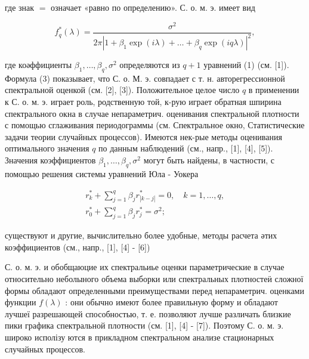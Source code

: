 \documentclass[10pt]{article}
\begin{document}
где знак $=$ означает «равно по определению». С. о. м. э. имеет вид



\[

f_{q}^{*}(\lambda)=\frac{\sigma^{2}}{2 \pi\left|1+\beta_{1} \exp (i \lambda)+\ldots+\beta_{q} \exp (i q \lambda)\right|^{2}},

\]



где коәффициенты $\beta_{1}, \ldots, \beta_{q}, \sigma^{2}$ определяются из $q+1$ уравнений (1) (см. [1]). Формула (3) показывает, что С. о. М. э. совпадает с т. н. авторегрессионной спектральной оценкой (см. [2], [3]). Положительное целое число $q$ в применении к С. о. м. э. играет роль, родственную той, к-рую играет обратная шпирина спектрального окна в случае непараметрич. оценивания спектральной плотности с помощью сглаживания периодограммы (см. Спектральное окно, Статистические задачи теории случайных процессов). Имеются нек-рые методы оценивания оптимального значения $q$ по данным наблюдений (см., напр., [1], [4], [5]). Значения коэффициентов $\beta_{1}, \ldots, \beta_{q}, \sigma^{2}$ могут быть найдены, в частности, с помощью решения системы уравнений Юла - Уокера



\[

\begin{gathered}

r_{k}^{*}+\sum_{j=1}^{q} \beta_{j} r_{|k-j|}^{*}=0, \quad k=1, \ldots, q, \\

r_{0}^{*}+\sum_{j=1}^{q} \beta_{j} r_{j}^{*}=\sigma^{2} ;

\end{gathered}

\]



существуют и другие, вычислительно более удобные, методы расчета әтих коэффициентов (см., напр., [1], [4] - [6])



С. о. м. э. и обобщаюцие их спектральиье оценки параметрические в случае относительно неболыного объема выборки или спектральных плотностеӥ сложної формы обладают определенными преимуществами перед непараметрич. оценками функции $f(\lambda)$ : они обычно имеют более правильную форму и обладают лучшеї разрешающей способностью, т. е. позволяют лучше различать близкие пики графика спектральной плотности (см. [1], [4] - [7]). Поэтому С. о. м. э. широко исполізу ются в прикладном спектральном анализе стационарных случайных процессов.
\end{document}
